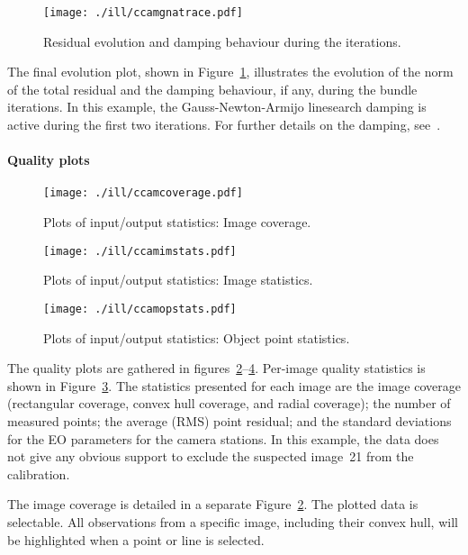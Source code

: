 \documentclass{article}
\begin{document}
\begin{figure}[tbp]
\centering
\texttt{[image: ./ill/ccamgnatrace.pdf]}
\caption{\label{fig:gnatrace}Residual evolution and damping behaviour during the iterations.}
\end{figure}

The final evolution plot, shown in Figure~\ref{fig:gnatrace},
illustrates the evolution of the norm of the total residual and the
damping behaviour, if any, during the bundle iterations. In this
example, the Gauss-Newton-Armijo linesearch damping is active during
the first two iterations. For further details on the damping,
see~\citet{Borlin2013:Bundle}.

\paragraph{Quality plots}
\label{sec:org6ee2188}

\begin{figure}[tbp]
\centering
\texttt{[image: ./ill/ccamcoverage.pdf]}
\caption{\label{fig:ccamCoverage}Plots of input/output statistics: Image coverage.}
\end{figure}

\begin{figure}[tbp]
\centering
\texttt{[image: ./ill/ccamimstats.pdf]}
\caption{\label{fig:ccamImstats}Plots of input/output statistics: Image statistics.}
\end{figure}

\begin{figure}[tbp]
\centering
\texttt{[image: ./ill/ccamopstats.pdf]}
\caption{\label{fig:ccamOPstats}Plots of input/output statistics: Object point statistics.}
\end{figure}

The quality plots are gathered in
figures~\ref{fig:ccamCoverage}--\ref{fig:ccamOPstats}. Per-image quality
statistics is shown in Figure~\ref{fig:ccamImstats}. The statistics
presented for each image are the image coverage (rectangular coverage,
convex hull coverage, and radial coverage); the number of measured
points; the average (RMS) point residual; and the standard deviations
for the EO parameters for the camera stations. In this example, the
data does not give any obvious support to exclude the suspected
image~21 from the calibration.

The image coverage is detailed in a separate
Figure~\ref{fig:ccamCoverage}. The plotted data is selectable. All
observations from a specific image, including their convex hull, will
be highlighted when a point or line is selected.
\end{document}

